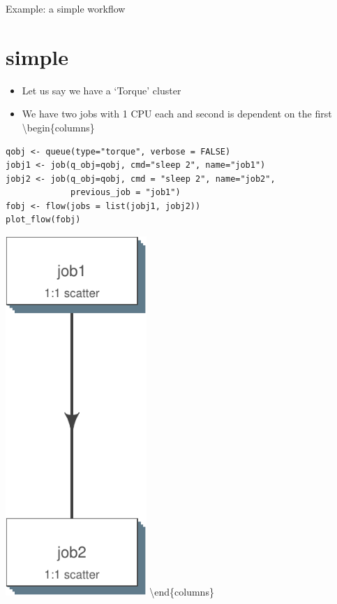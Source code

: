 \documentclass[ignorenonframetext,]{beamer}
\begin{document}
\begin{frame}[fragile]{Example: a simple workflow}

\section{simple}

\begin{itemize}
\itemsep1pt\parskip0pt
\item
  Let us say we have a `Torque' cluster
\item
  We have two jobs with 1 CPU each and second is dependent on the first
  \textbackslash{}begin\{columns\} 
\end{itemize}

\begin{verbatim}
qobj <- queue(type="torque", verbose = FALSE)
jobj1 <- job(q_obj=qobj, cmd="sleep 2", name="job1")
jobj2 <- job(q_obj=qobj, cmd = "sleep 2", name="job2", 
             previous_job = "job1")
fobj <- flow(jobs = list(jobj1, jobj2))
plot_flow(fobj)
\end{verbatim}

\includegraphics[page=1, type=pdf,ext=.pdf,read=.pdf, width=0.4\textwidth]{slides_files/figure-beamer/simple-1}
\textbackslash{}end\{columns\}

\end{frame}
\end{document}
